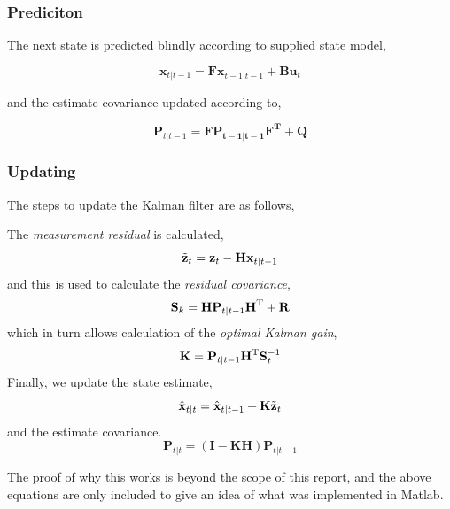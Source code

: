 \subsubsection{Prediciton}
The next state is predicted blindly according to supplied state model,

\begin{equation}
\mathbf{x}_{t|t-1} = \mathbf{Fx}_{t-1|t-1} + \mathbf{Bu}_{t}
\end{equation}

and the estimate covariance updated according to,

\begin{equation}
\mathbf{P}_{t|t-1} = \mathbf{FP_{t-1|t-1}F^{T}} + \mathbf{Q}
\end{equation}

\subsubsection{Updating}

The steps to update the Kalman filter are as follows,

The \emph{measurement residual} is calculated,
\begin{equation*}
\tilde{\textbf{z}}_t = \textbf{z}_t - \textbf{H}\textbf{x}_{t|t-1}\\
\end{equation*}
and this is used to calculate the \emph{residual covariance},
\begin{equation*}
\textbf{S}_k = \textbf{H} \textbf{P}_{t|t-1} \textbf{H}^\text{T} + \textbf{R}\\
\end{equation*}
which in turn allows calculation of the \emph{optimal Kalman gain},
\begin{equation*}
\textbf{K} = \textbf{P}_{t|t-1}\textbf{H}^\text{T}\textbf{S}_t^{-1}\\
\end{equation*}
Finally, we update the state estimate,
\begin{equation*}
\hat{\textbf{x}}_{t|t} = \hat{\textbf{x}}_{t|t-1} + \textbf{K}\tilde{\textbf{z}}_t\\
\end{equation*}
and the estimate covariance.
\begin{equation*}
\textbf{P}_{t|t} = (\mathbf{I} - \textbf{K} \textbf{H}) \textbf{P}_{t|t-1}
\end{equation*}

The proof of why this works is beyond the scope of this report, and the above
equations are only included to give an idea of what was implemented in Matlab.

